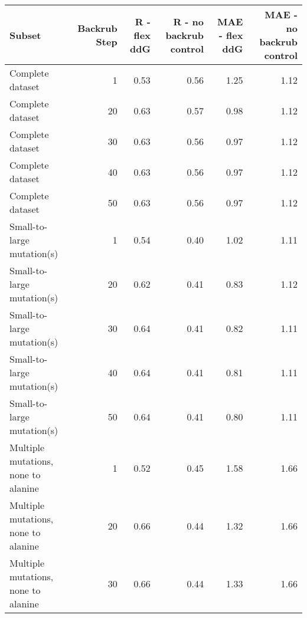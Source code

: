 \begin{table}
\begin{tabular}{lrrrrr}
\toprule
                              Subset &  Backrub Step &  R - flex ddG &  R - no backrub control &  MAE - flex ddG &  MAE - no backrub control \\
\midrule
                    Complete dataset &             1 &          0.53 &                    0.56 &            1.25 &                      1.12 \\
                    Complete dataset &            20 &          0.63 &                    0.57 &            0.98 &                      1.12 \\
                    Complete dataset &            30 &          0.63 &                    0.56 &            0.97 &                      1.12 \\
                    Complete dataset &            40 &          0.63 &                    0.56 &            0.97 &                      1.12 \\
                    Complete dataset &            50 &          0.63 &                    0.56 &            0.97 &                      1.12 \\
          Small-to-large mutation(s) &             1 &          0.54 &                    0.40 &            1.02 &                      1.11 \\
          Small-to-large mutation(s) &            20 &          0.62 &                    0.41 &            0.83 &                      1.12 \\
          Small-to-large mutation(s) &            30 &          0.64 &                    0.41 &            0.82 &                      1.11 \\
          Small-to-large mutation(s) &            40 &          0.64 &                    0.41 &            0.81 &                      1.11 \\
          Small-to-large mutation(s) &            50 &          0.64 &                    0.41 &            0.80 &                      1.11 \\
 Multiple mutations, none to alanine &             1 &          0.52 &                    0.45 &            1.58 &                      1.66 \\
 Multiple mutations, none to alanine &            20 &          0.66 &                    0.44 &            1.32 &                      1.66 \\
 Multiple mutations, none to alanine &            30 &          0.66 &                    0.44 &            1.33 &                      1.66 \\

\end{tabular}
\end{table}
